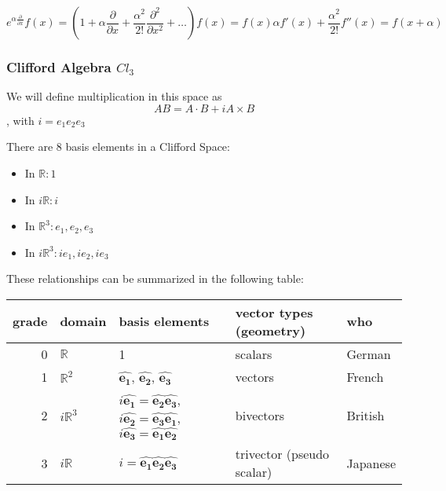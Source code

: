 \documentclass[11pt]{article}
\begin{document}
$$e^{\alpha \frac{\partial}{\partial x}}f(x) = (1 + \alpha
\frac{\partial}{\partial x} + \frac{\alpha^2}{2!} \frac{\partial ^2}{\partial
x^2} + \dots )f(x) = f(x) \alpha f'(x) +\frac{\alpha^2}{2!} f''(x) = f(x +
\alpha)$$
\subsubsection{Clifford Algebra $Cl_3$}
\label{sec-2-2-2}


We will define multiplication in this space as $$AB = A \cdot B + i A \times
B$$, with $i = e_1 e_2 e_3$

There are 8 basis elements in a Clifford Space:
\begin{itemize}
\item In $\mathbb{R}: 1$
\item In $i\mathbb{R}: i$
\item In $\mathbb{R}^3: e_1, e_2, e_3$
\item In $i\mathbb{R}^3: ie_1, ie_2, ie_3$
\end{itemize}

These relationships can be summarized in the following table:


\begin{center}
\begin{tabular}{rllll}
 grade  &  domain            &  basis elements                                                                                                                                                                                                                        &  vector types (geometry)    &  who       \\
\hline
     0  &  $\mathbb{R}$      &  1                                                                                                                                                                                                                                     &  scalars                    &  German    \\
     1  &  $\mathbb{R}^2$    &  $\bm{\hat{e_1}}$, $\bm{\hat{e_2}}$,  $\bm{\hat{e_3}}$                                                                                                                                                         &  vectors                    &  French    \\
     2  &  $i \mathbb{R}^3$  &  $i \bm{\hat{e_1}} = \bm{\hat{e_2}} \bm{\hat{e_3}}$,  $i \bm{\hat{e_2}} = \bm{\hat{e_3}} \bm{\hat{e_1}}$,  $i \bm{\hat{e_3}} = \bm{\hat{e_1}} \bm{\hat{e_2}}$  &  bivectors                  &  British   \\
     3  &  $i \mathbb{R}$    &  $i =\bm{\hat{e_1}} \bm{\hat{e_2}} \bm{\hat{e_3}}$                                                                                                                                                             &  trivector (pseudo scalar)  &  Japanese  \\
\end{tabular}
\end{center}
\end{document}
